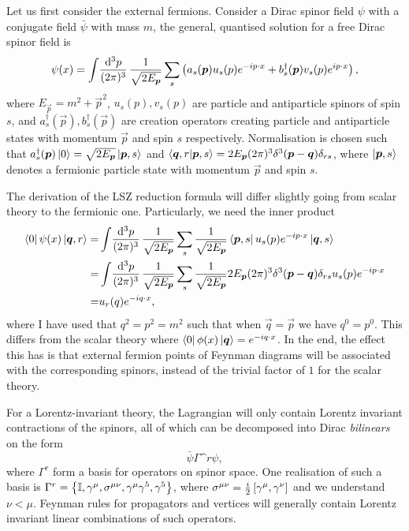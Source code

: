 \documentclass[../main.tex]{subfiles}
\begin{document}
Let us first consider the external fermions.
Consider a Dirac spinor field \(\psi\) with a conjugate field \(\bar\psi\) with mass \(m\), the general, quantised solution for a free Dirac spinor field is~\cite{Peskin}
\begin{equation}
  \psi(x) = \loopintegral[3]{p} \frac{1}{\sqrt{2E_{\vec{p}}}} \sum_s \pclosed{a_s(\vec{p}) u_s(p) \exp{-i p\cdot x} + b_s^\dagger(\vec{p}) v_s(p) \exp{i p\cdot x}},
\end{equation}
where \(E_{\vec{p}} = m^2 + \vec{p}^2\), \(u_s(p), v_s(p)\) are particle and antiparticle spinors of spin \(s\), and \(a_s^\dagger(\vec{p}), b_s^\dagger(\vec{p})\) are creation operators creating particle and antiparticle states with momentum \(\vec{p}\) and spin \(s\) respectively.
Normalisation is chosen such that \(a_s^\dagger(\vec{p}) \ket{0} = \sqrt{2E_{\vec{p}}} \ket{\vec{p}, s}\) and \(\braket{\vec{q}, r}{\vec{p}, s} = 2E_{\vec{p}} (2\pi)^3 \delta^3(\vec{p}-\vec{q}) \delta_{rs}\), where \(\ket{\vec{p}, s}\) denotes a fermionic particle state with momentum \(\vec{p}\) and spin \(s\).

The derivation of the LSZ reduction formula will differ slightly going from scalar theory to the fermionic one.
Particularly, we need the inner product
\begin{align}
  \nonumber
  \bra{0}\psi(x)\ket{\vec{q},r} = & \loopintegral[3]{p} \frac{1}{\sqrt{2E_{\vec{p}}}} \sum_s \frac{1}{\sqrt{2E_{\vec{p}}}} \bra{\vec{p}, s}  u_s(p) \exp{-i p\cdot x} \ket{\vec{q}, s}                          \\
  \nonumber
  =                               & \loopintegral[3]{p} \frac{1}{\sqrt{2E_{\vec{p}}}} \sum_s \frac{1}{\sqrt{2E_{\vec{p}}}} 2E_{\vec{p}} (2\pi)^3 \delta^3(\vec{p}-\vec{q}) \delta_{rs} u_s(p) \exp{-i p\cdot x} \\
  =                               & u_r(q) \exp{-i q\cdot x},
\end{align}
where I have used that \(q^2 = p^2 = m^2\) such that when \(\vec{q} = \vec{p}\) we have \(q^0 = p^0\).
This differs from the scalar theory where \(\bra{0} \phi(x) \ket{\vec{q}} = \exp{-i q\cdot x}\).
In the end, the effect this has is that external fermion points of Feynman diagrams will be associated with the corresponding spinors, instead of the trivial factor of \(1\) for the scalar theory.
\medskip

For a Lorentz-invariant theory, the Lagrangian will only contain Lorentz invariant contractions of the spinors, all of which can be decomposed into Dirac \emph{bilinears} on the form
\begin{equation}
  \bar\psi \Gamma\^r \psi,
\end{equation}
where \(\Gamma^r\) form a basis for operators on spinor space.
One realisation of such a basis is \(\Gamma\^r = \cclosed{\eye, \gamma\^\mu, \sigma\^{\mu\nu}, \gamma\^\mu \gamma\^5, \gamma\^5}\), where \(\sigma\^{\mu\nu} = \frac{i}{2} \bclosed{\gamma\^\mu, \gamma\^\nu}\) and we understand \(\nu < \mu\).
Feynman rules for propagators and vertices will generally contain Lorentz invariant linear combinations of such operators.
\end{document}
